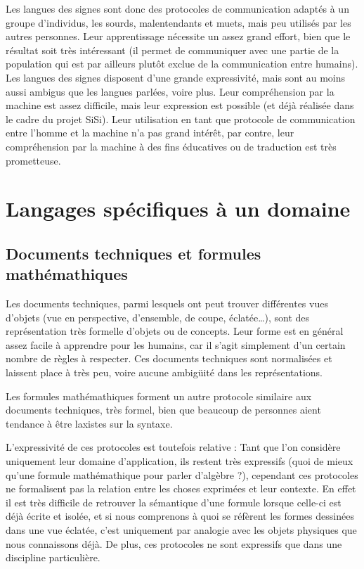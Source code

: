 \documentclass[french,a4paper]{article}
\begin{document}
Les langues des signes sont donc des protocoles de communication
adaptés à un groupe d'individus, les sourds, malentendants et muets,
mais peu utilisés par les autres personnes. Leur apprentissage
nécessite un assez grand effort, bien que le résultat soit très
intéressant (il permet de communiquer avec une partie de la population
qui est par ailleurs plutôt exclue de la communication entre
humains). Les langues des signes disposent d'une grande expressivité,
mais sont au moins aussi ambigus que les langues parlées, voire
plus. Leur compréhension par la machine est assez difficile, mais leur
expression est possible (et déjà réalisée dans le cadre du projet
SiSi). Leur utilisation en tant que protocole de communication entre
l'homme et la machine n'a pas grand intérêt, par contre, leur
compréhension par la machine à des fins éducatives ou de traduction
est très prometteuse.

\section{Langages spécifiques à un domaine}
\subsection{Documents techniques et formules mathémathiques}

Les documents techniques, parmi lesquels ont peut trouver différentes vues d'objets (vue en perspective, d'ensemble, de coupe, éclatée…),
sont des représentation très formelle d'objets ou de concepts. Leur forme est en général assez facile à apprendre pour les humains, car il
s'agit simplement d'un certain nombre de règles à respecter. Ces documents techniques sont normalisées et laissent place à très peu, voire
aucune ambigüité dans les représentations.

Les formules mathémathiques forment un autre protocole similaire aux documents techniques, très formel, bien que beaucoup de personnes aient
tendance à être laxistes sur la syntaxe.

L'expressivité de ces protocoles est toutefois relative : Tant que l'on considère uniquement leur domaine d'application, ils restent très
expressifs (quoi de mieux qu'une formule mathémathique pour parler d'algèbre ?), cependant ces protocoles ne formalisent pas la relation
entre les choses exprimées et leur contexte. En effet il est très difficile de retrouver la sémantique d'une formule lorsque celle-ci est
déjà écrite et isolée, et si nous comprenons à quoi se réfèrent les formes dessinées dans une vue éclatée, c'est uniquement par analogie
avec les objets physiques que nous connaissons déjà. De plus, ces protocoles ne sont expressifs que dans une discipline particulière.
\end{document}
